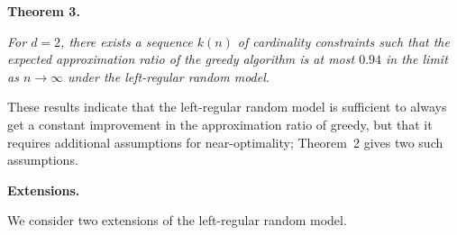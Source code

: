 \documentclass[10pt,a4paper]{article}
\begin{document}


\par\medskip\noindent\textbf{\textbf{Theorem 3}\textbf{.}}\par



\emph{For $d=2$, there exists a sequence $k(n)$ of cardinality constraints such that the expected approximation ratio of the greedy algorithm is at most $0.94$ in the limit as $n\rightarrow\infty$ under the left-regular random model.}\par







These results indicate that the left-regular random model is sufficient to always get a constant improvement in the approximation ratio of greedy, but that it requires additional assumptions for near-optimality; Theorem 2 gives two such assumptions.\par





\par\medskip\noindent\textbf{Extensions.}\par




We consider two extensions of the left-regular random model.\par
\end{document}
